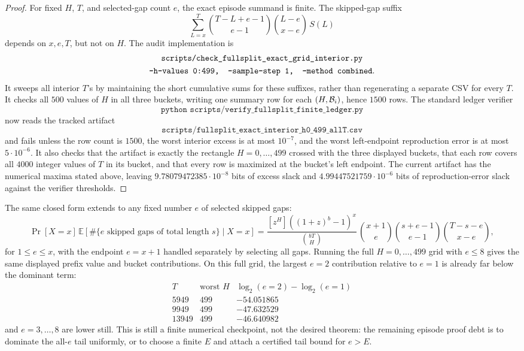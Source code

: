 \begin{proof}
For fixed \(H\), \(T\), and selected-gap count \(e\), the exact episode summand is finite.  The skipped-gap suffix
\[
\sum_{L=x}^{T}\binom{T-L+e-1}{e-1}\binom{L-e}{x-e}\,S(L)
\]
depends on \(x,e,T\), but not on \(H\).  The audit implementation is
\[
\begin{gathered}
\texttt{scripts/check\_fullsplit\_exact\_grid\_interior.py}\\
\texttt{--h-values 0:499,\quad --sample-step 1,\quad --method combined}.
\end{gathered}
\]
It sweeps all interior \(T\)'s by maintaining the short cumulative sums for these suffixes, rather than regenerating a
separate CSV for every \(T\).  It checks all \(500\) values of \(H\) in all three buckets, writing one summary row for
each \((H,{\cal B}_i)\), hence \(1500\) rows.  The standard ledger verifier
\[
\texttt{python scripts/verify\_fullsplit\_finite\_ledger.py}
\]
now reads the tracked artifact
\[
\texttt{scripts/fullsplit\_exact\_interior\_h0\_499\_allT.csv}
\]
and fails unless the row count is \(1500\), the worst interior excess is at most \(10^{-7}\), and the worst
left-endpoint reproduction error is at most \(5\cdot10^{-6}\).  It also checks that the artifact is exactly the
rectangle \(H=0,\ldots,499\) crossed with the three displayed buckets, that each row covers all \(4000\) integer
values of \(T\) in its bucket, and that every row is maximized at the bucket's left endpoint.  The current artifact has
the numerical maxima stated above, leaving \(9.78079472385\cdot10^{-8}\) bits of excess slack and
\(4.99447521759\cdot10^{-6}\) bits of reproduction-error slack against the verifier thresholds.
\end{proof}

The same closed form extends to any fixed number \(e\) of selected skipped gaps:
\[
\Pr[X=x]\,
\mathbb{E}[\#\{e\text{ skipped gaps of total length }s\}\mid X=x]
=
\frac{[z^H]((1+z)^b-1)^x}{\binom{bT}{H}}\,
\binom{x+1}{e}\binom{s+e-1}{e-1}\binom{T-s-e}{x-e},
\]
for \(1\le e\le x\), with the endpoint \(e=x+1\) handled separately by selecting all gaps.  Running the full
\(H=0,\ldots,499\) grid with \(e\le8\) gives the same displayed prefix value and bucket contributions.  On this full
grid, the largest \(e=2\) contribution relative to \(e=1\) is already far below the dominant term:
\[
\begin{array}{c|c|c}
T & \text{worst }H & \log_2(e=2)-\log_2(e=1)\\
\hline
5949 & 499 & -54.051865\\
9949 & 499 & -47.632529\\
13949 & 499 & -46.640982
\end{array}
\]
and \(e=3,\ldots,8\) are lower still.  This is still a finite numerical checkpoint, not the desired theorem: the remaining
episode proof debt is to dominate the all-\(e\) tail uniformly, or to choose a finite \(E\) and attach a certified
tail bound for \(e>E\).

